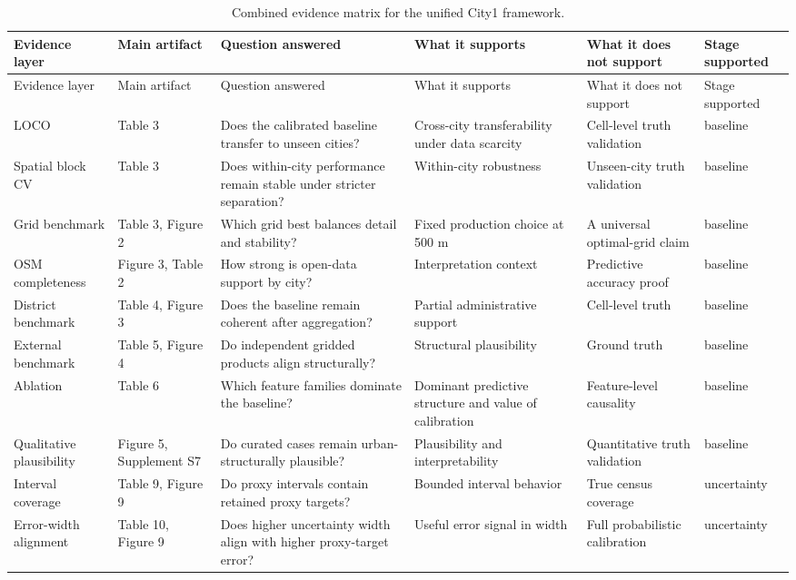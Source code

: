 \begingroup
\scriptsize
\setlength{\LTleft}{0pt}
\setlength{\LTright}{0pt}
\begin{longtable}{L{0.15\textwidth}L{0.15\textwidth}L{0.18\textwidth}L{0.18\textwidth}L{0.18\textwidth}L{0.10\textwidth}}
\caption{Combined evidence matrix for the unified City1 framework.}\label{tab:s3-combined-evidence}\\
\toprule
Evidence layer & Main artifact & Question answered & What it supports & What it does not support & Stage supported \\
\midrule
\endfirsthead
\toprule
Evidence layer & Main artifact & Question answered & What it supports & What it does not support & Stage supported \\
\midrule
\endhead
LOCO & Table 3 & Does the calibrated baseline transfer to unseen cities? & Cross-city transferability under data scarcity & Cell-level truth validation & baseline \\
Spatial block CV & Table 3 & Does within-city performance remain stable under stricter separation? & Within-city robustness & Unseen-city truth validation & baseline \\
Grid benchmark & Table 3, Figure 2 & Which grid best balances detail and stability? & Fixed production choice at 500 m & A universal optimal-grid claim & baseline \\
OSM completeness & Figure 3, Table 2 & How strong is open-data support by city? & Interpretation context & Predictive accuracy proof & baseline \\
District benchmark & Table 4, Figure 3 & Does the baseline remain coherent after aggregation? & Partial administrative support & Cell-level truth & baseline \\
External benchmark & Table 5, Figure 4 & Do independent gridded products align structurally? & Structural plausibility & Ground truth & baseline \\
Ablation & Table 6 & Which feature families dominate the baseline? & Dominant predictive structure and value of calibration & Feature-level causality & baseline \\
Qualitative plausibility & Figure 5, Supplement S7 & Do curated cases remain urban-structurally plausible? & Plausibility and interpretability & Quantitative truth validation & baseline \\
Interval coverage & Table 9, Figure 9 & Do proxy intervals contain retained proxy targets? & Bounded interval behavior & True census coverage & uncertainty \\
Error-width alignment & Table 10, Figure 9 & Does higher uncertainty width align with higher proxy-target error? & Useful error signal in width & Full probabilistic calibration & uncertainty \\

\end{longtable}
